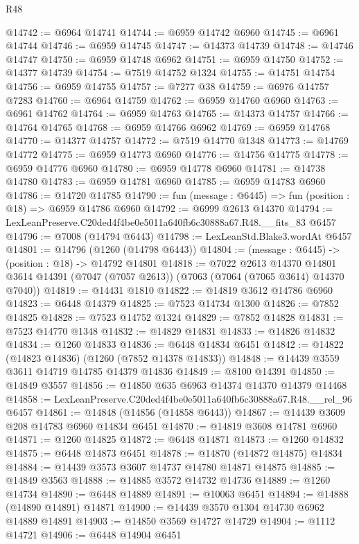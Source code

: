 \begin{lexlean}{R48}
\begin{coremodule}
@14742 := @6964 @14741
@14744 := @6959 @14742 @6960
@14745 := @6961 @14744
@14746 := @6959 @14745
@14747 := @14373 @14739
@14748 := @14746 @14747
@14750 := @6959 @14748 @6962
@14751 := @6959 @14750
@14752 := @14377 @14739
@14754 := @7519 @14752 @1324
@14755 := @14751 @14754
@14756 := @6959 @14755
@14757 := @7277 @38
@14759 := @6976 @14757 @7283
@14760 := @6964 @14759
@14762 := @6959 @14760 @6960
@14763 := @6961 @14762
@14764 := @6959 @14763
@14765 := @14373 @14757
@14766 := @14764 @14765
@14768 := @6959 @14766 @6962
@14769 := @6959 @14768
@14770 := @14377 @14757
@14772 := @7519 @14770 @1348
@14773 := @14769 @14772
@14775 := @6959 @14773 @6960
@14776 := @14756 @14775
@14778 := @6959 @14776 @6960
@14780 := @6959 @14778 @6960
@14781 := @14738 @14780
@14783 := @6959 @14781 @6960
@14785 := @6959 @14783 @6960
@14786 := @14720 @14785
@14790 := fun (message : @6445) => fun (position : @18) => @6959 @14786 @6960
@14792 := @6999 @2613 @14370
@14794 := LexLeanPreserve.C20ded4f4be0e5011a640fb6c30888a67.R48.__fits_83 @6457
@14796 := @7008 (@14794 @6443)
@14798 := LexLeanStd.Blake3.wordAt @6457
@14801 := @14796 (@1260 (@14798 @6443))
@14804 := (message : @6445) -> (position : @18) -> @14792 @14801
@14818 := @7022
    @2613
    @14370
    @14801
    @3614
    @14391
    (@7047 (@7057 @2613))
    (@7063 (@7064 (@7065 @3614) @14370 @7040))
@14819 := @14431 @1810
@14822 := @14819 @3612 @14786 @6960
@14823 := @6448 @14379
@14825 := @7523 @14734 @1300
@14826 := @7852 @14825
@14828 := @7523 @14752 @1324
@14829 := @7852 @14828
@14831 := @7523 @14770 @1348
@14832 := @14829 @14831
@14833 := @14826 @14832
@14834 := @1260 @14833
@14836 := @6448 @14834 @6451
@14842 := @14822 (@14823 @14836) (@1260 (@7852 @14378 @14833))
@14848 := @14439 @3559 @3611 @14719 @14785 @14379 @14836
@14849 := @8100 @14391
@14850 := @14849 @3557
@14856 := @14850 @635 @6963 @14374 @14370 @14379 @14468
@14858 := LexLeanPreserve.C20ded4f4be0e5011a640fb6c30888a67.R48.__rel_96 @6457
@14861 := @14848 (@14856 (@14858 @6443))
@14867 := @14439 @3609 @208 @14783 @6960 @14834 @6451
@14870 := @14819 @3608 @14781 @6960
@14871 := @1260 @14825
@14872 := @6448 @14871
@14873 := @1260 @14832
@14875 := @6448 @14873 @6451
@14878 := @14870 (@14872 @14875) @14834
@14884 := @14439 @3573 @3607 @14737 @14780 @14871 @14875
@14885 := @14849 @3563
@14888 := @14885 @3572 @14732 @14736
@14889 := @1260 @14734
@14890 := @6448 @14889
@14891 := @10063 @6451
@14894 := @14888 (@14890 @14891) @14871
@14900 := @14439 @3570 @1304 @14730 @6962 @14889 @14891
@14903 := @14850 @3569 @14727 @14729
@14904 := @1112 @14721
@14906 := @6448 @14904 @6451

\end{coremodule}
\end{lexlean}
